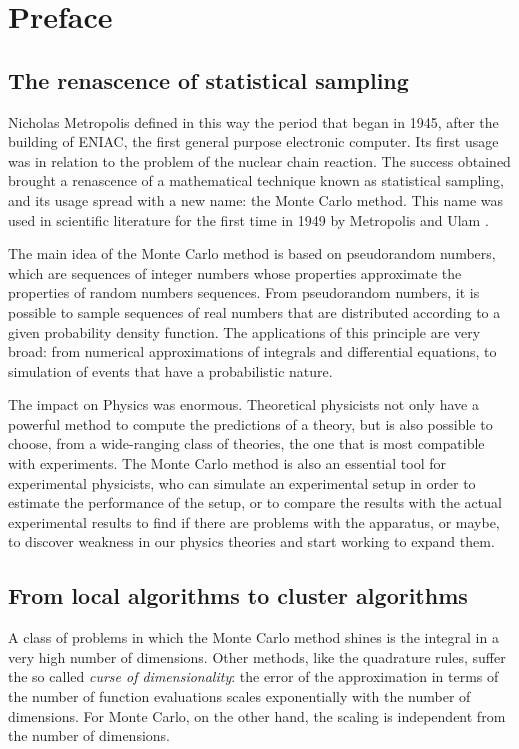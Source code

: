 \begingroup
\let\clearpage\relax
\let\cleardoublepage\relax
\let\cleardoublepage\relax

\chapter*{Preface}

\section*{The renascence of statistical sampling}
Nicholas Metropolis defined in this way \cite{metropolis:1987} the period that began in 1945, after the building of ENIAC, the first general purpose electronic computer.
Its first usage was in relation to the problem of the nuclear chain reaction.
The success obtained brought a renascence of a mathematical technique known as statistical sampling, and its usage spread with a new name: the Monte Carlo method.
This name was used in scientific literature for the first time in 1949 by Metropolis and Ulam \cite{metropolis-ulam:1949}.

The main idea of the Monte Carlo method is based on pseudorandom numbers, which are sequences of integer numbers whose properties approximate the properties of random numbers sequences.
From pseudorandom numbers, it is possible to sample sequences of real numbers that are distributed according to a given probability density function.
The applications of this principle are very broad: from numerical approximations of integrals and differential equations, to simulation of events that have a probabilistic nature.

The impact on Physics was enormous. Theoretical physicists not only have a powerful method to compute the predictions of a theory, but is also possible to choose, from a wide-ranging class of theories, the one that is most compatible with experiments.
The Monte Carlo method is also an essential tool for experimental physicists, who can simulate an experimental setup in order to estimate the performance of the setup, or to compare the results with the actual experimental results to find if there are problems with the apparatus, or maybe, to discover weakness in our physics theories and start working to expand them.

\section*{From local algorithms to cluster algorithms}
A class of problems in which the Monte Carlo method shines is the integral in a very high number of dimensions.
Other methods, like the quadrature rules, suffer the so called \emph{curse of dimensionality}: the error of the approximation in terms of the number of function evaluations scales exponentially with the number of dimensions.
For Monte Carlo, on the other hand, the scaling is independent from the number of dimensions.

